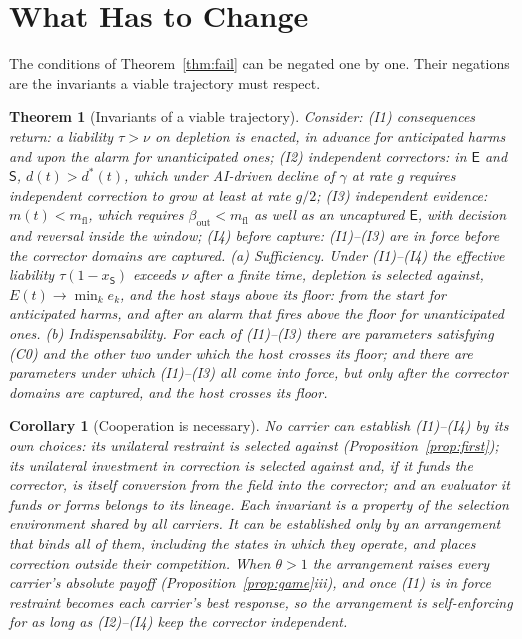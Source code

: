 \documentclass[letterpaper]{article} %
\newtheorem{theorem}{Theorem}
\newtheorem{corollary}{Corollary}
\theoremstyle{definition}
\newcommand{\dE}{\mathsf{E}}
\newcommand{\dS}{\mathsf{S}}
\newcommand{\mfl}{m_{\mathrm{fl}}}
\begin{document}
\section{What Has to Change}\label{sec:change}

The conditions of Theorem~\ref{thm:fail} can be negated one by one. Their negations are the invariants a viable trajectory must respect.

\begin{theorem}[Invariants of a viable trajectory]\label{thm:invariants}
Consider: (I1) \emph{consequences return}: a liability $\tau>\nu$ on depletion is enacted, in advance for anticipated harms and upon the alarm for unanticipated ones; (I2) \emph{independent correctors}: in $\dE$ and $\dS$, $d(t)>d^\ast(t)$, which under AI-driven decline of $\gamma$ at rate $g$ requires independent correction to grow at least at rate $g/2$; (I3) \emph{independent evidence}: $m(t)<\mfl$, which requires $\beta_{\mathrm{out}}<\mfl$ as well as an uncaptured $\dE$, with decision and reversal inside the window; (I4) \emph{before capture}: (I1)--(I3) are in force before the corrector domains are captured. (a) \emph{Sufficiency.} Under (I1)--(I4) the effective liability $\tau(1-x_\dS)$ exceeds $\nu$ after a finite time, depletion is selected against, $E(t)\to\min_ke_k$, and the host stays above its floor: from the start for anticipated harms, and after an alarm that fires above the floor for unanticipated ones. (b) \emph{Indispensability.} For each of (I1)--(I3) there are parameters satisfying (C0) and the other two under which the host crosses its floor; and there are parameters under which (I1)--(I3) all come into force, but only after the corrector domains are captured, and the host crosses its floor.
\end{theorem}

\begin{corollary}[Cooperation is necessary]\label{cor:coop}
No carrier can establish (I1)--(I4) by its own choices: its unilateral restraint is selected against (Proposition~\ref{prop:first}); its unilateral investment in correction is selected against and, if it funds the corrector, is itself conversion from the field into the corrector; and an evaluator it funds or forms belongs to its lineage. Each invariant is a property of the selection environment shared by all carriers. It can be established only by an arrangement that binds all of them, including the states in which they operate, and places correction outside their competition. When $\theta>1$ the arrangement raises every carrier's absolute payoff (Proposition~\ref{prop:game}iii), and once (I1) is in force restraint becomes each carrier's best response, so the arrangement is self-enforcing for as long as (I2)--(I4) keep the corrector independent.
\end{corollary}
\end{document}
